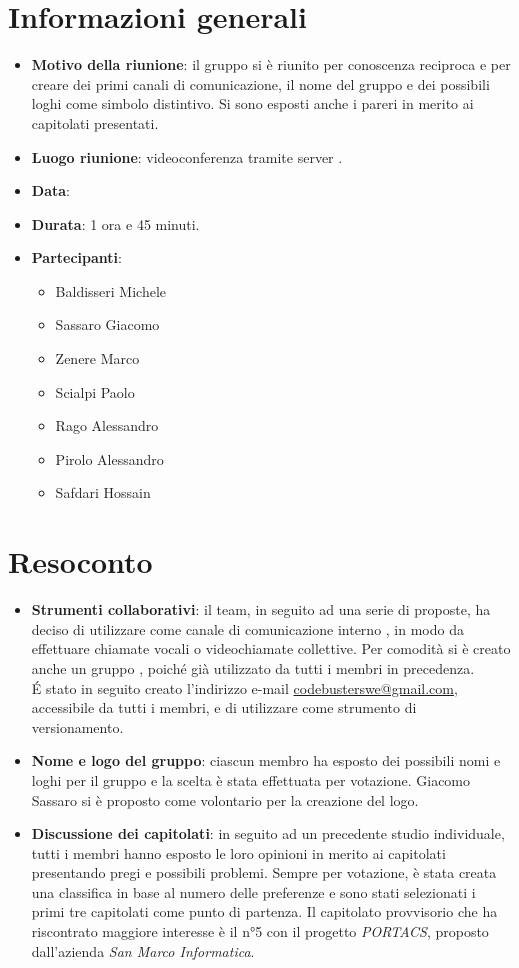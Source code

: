\section{Informazioni generali}
\begin{itemize}
\item \textbf{Motivo della riunione}: il gruppo si è riunito per conoscenza reciproca e per creare dei primi canali di comunicazione, il nome del gruppo e dei possibili loghi come simbolo distintivo. Si sono esposti anche i pareri in merito ai capitolati presentati.
\item \textbf{Luogo riunione}: videoconferenza tramite server .
\item \textbf{Data}: \Data{}
\item \textbf{Durata}: 1 ora e 45 minuti.
\item \textbf{Partecipanti}:
	\begin{itemize}
	\item Baldisseri Michele
	\item Sassaro Giacomo
	\item Zenere Marco
	\item Scialpi Paolo
	\item Rago Alessandro
	\item Pirolo Alessandro
	\item Safdari Hossain
	\end{itemize}
\end{itemize}
\newpage
\section{Resoconto}
\begin{itemize}
\item \textbf{Strumenti collaborativi}: il team, in seguito ad una serie di proposte, ha deciso di utilizzare come canale di comunicazione interno , in modo da effettuare chiamate vocali o videochiamate collettive. Per comodità si è creato anche un gruppo , poiché già utilizzato da tutti i membri in precedenza.\\ \'E stato in seguito creato l'indirizzo e-mail \href{mailto:codebusterswe@gmail.com}{\color{cyan}codebusterswe@gmail.com}, accessibile da tutti i membri, e di utilizzare  come strumento di versionamento.

\item \textbf{Nome e logo del gruppo}: ciascun membro ha esposto dei possibili nomi e loghi per il gruppo e la scelta è stata effettuata per votazione. Giacomo Sassaro si è proposto come volontario per la creazione del logo.

\item \textbf{Discussione dei capitolati}: in seguito ad un precedente studio individuale, tutti i membri hanno esposto le loro opinioni in merito ai capitolati presentando pregi e possibili problemi. Sempre per votazione, è stata creata una classifica in base al numero delle preferenze e sono stati selezionati i primi tre capitolati come punto di partenza. Il capitolato provvisorio che ha riscontrato maggiore interesse è il n°5 con il progetto \textit{PORTACS}, proposto dall'azienda \textit{San Marco Informatica}.
\end{itemize}